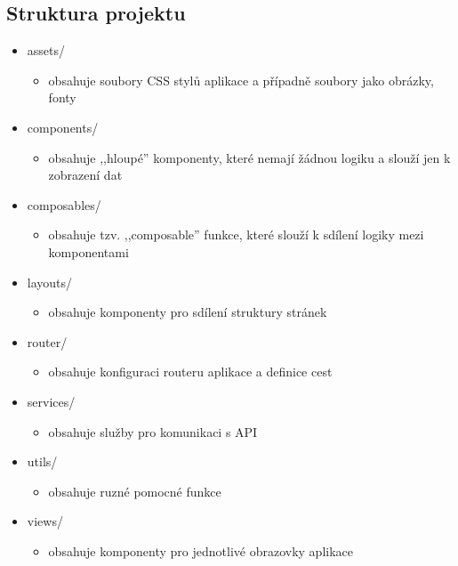 \subsection{Struktura projektu}
\begin{itemize}
    \item assets/
        \begin{itemize}
            \item obsahuje soubory CSS stylů aplikace a případně soubory jako obrázky, fonty
        \end{itemize}
    \item components/
        \begin{itemize}
            \item obsahuje ,,hloupé'' komponenty, které nemají žádnou logiku a slouží jen k zobrazení dat
        \end{itemize}
    \item composables/
        \begin{itemize}
            \item obsahuje tzv. ,,composable'' funkce, které slouží k sdílení logiky mezi komponentami
        \end{itemize}
    \item layouts/
        \begin{itemize}
            \item obsahuje komponenty pro sdílení struktury stránek
        \end{itemize}
    \item router/
        \begin{itemize}
            \item obsahuje konfiguraci routeru aplikace a definice cest
        \end{itemize}
    \item services/
        \begin{itemize}
            \item obsahuje služby pro komunikaci s API
        \end{itemize}
    \item utils/
        \begin{itemize}
            \item obsahuje ruzné pomocné funkce
        \end{itemize}
    \item views/
        \begin{itemize}
            \item obsahuje komponenty pro jednotlivé obrazovky aplikace

\end{itemize}
\end{itemize}
